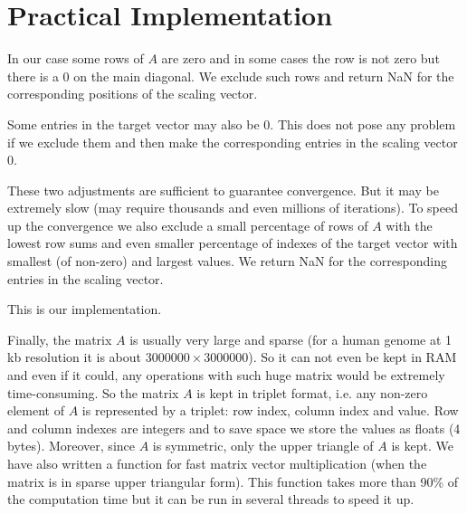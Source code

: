 \documentclass{article}
\begin{document}
  \section{Practical Implementation}
  
 In our case some rows of $A$ are zero and in some cases the row is not zero but there is a 0 on the main diagonal. We exclude such rows and return NaN for the corresponding positions of the scaling vector.
 
 Some entries in the target vector may also be 0. This does not pose any problem if we exclude them and then make the corresponding entries in the scaling vector 0.
 
 These two adjustments are sufficient to guarantee convergence. But it may be extremely slow (may require thousands and even millions of iterations). To speed up the convergence we also exclude a small percentage of rows of $A$ with the lowest row sums and even smaller percentage of indexes of the target vector with smallest (of non-zero) and largest values. We return NaN for the corresponding entries in the scaling vector.
 
 This is our implementation.
 
 Finally, the matrix $A$ is usually very large and sparse (for a human genome at 1 kb resolution it is about $3000000 \times 3000000$). So it can not even be kept in RAM and even if it could, any operations with such huge matrix would be extremely time-consuming. So the matrix $A$ is kept in triplet format, i.e. any non-zero element of $A$ is represented by a triplet: row index, column index and value. Row and column indexes are integers and to save space we store the values as floats (4 bytes). Moreover, since $A$ is symmetric, only the upper triangle of $A$ is kept. We have also written a function for fast matrix vector multiplication (when the matrix is in sparse upper triangular form). This function takes more than 90\% of the computation time but it can be run in several threads to speed it up.
  

%
\end{document}
